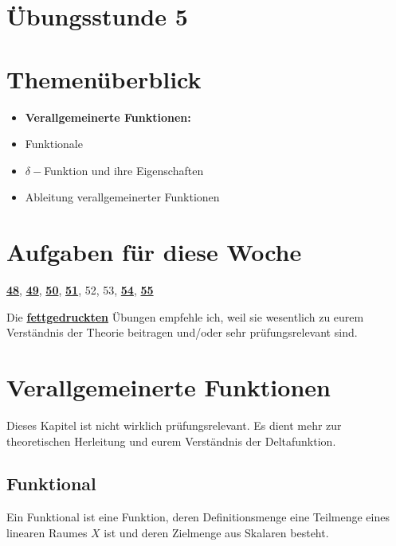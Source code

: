 \documentclass[11pt]{article}
\begin{document}
\thispagestyle{firstpage}

\setlength{\headheight}{1 \baselineskip}  %
\setlength{\parindent}{0pt}  %
\setlength{\parskip}{\baselineskip}  %

\vspace*{-5px}
\section*{Übungsstunde 5}

\section*{Themenüberblick}
\begin{itemize}
    \item \textbf{Verallgemeinerte Funktionen:}
    \item[] Funktionale
    \item[] $\delta-$Funktion und ihre Eigenschaften
    \item[] Ableitung verallgemeinerter Funktionen
\end{itemize}

\section*{Aufgaben für diese Woche}
\vspace{-0.5cm}

\underline{\textbf{48}}, \underline{\textbf{49}}, \underline{\textbf{50}}, \underline{\textbf{51}}, 52, 53, \underline{\textbf{54}}, \underline{\textbf{55}}\\
\vspace{-0.5cm}

Die \underline{\textbf{fettgedruckten}} Übungen empfehle ich, weil sie wesentlich zu eurem Verständnis der Theorie beitragen und/oder sehr prüfungsrelevant sind.

\vfill \null
\pagebreak

\section*{Verallgemeinerte Funktionen}
\vspace*{-0.5cm}
Dieses Kapitel ist nicht wirklich prüfungsrelevant. Es dient mehr zur theoretischen Herleitung und eurem Verständnis der Deltafunktion.
\vspace*{-0.5cm}
\subsection*{Funktional}
\vspace*{-0.5cm}
Ein Funktional ist eine Funktion, deren Definitionsmenge eine Teilmenge eines linearen Raumes $X$ ist und deren Zielmenge aus Skalaren besteht.
\end{document}
